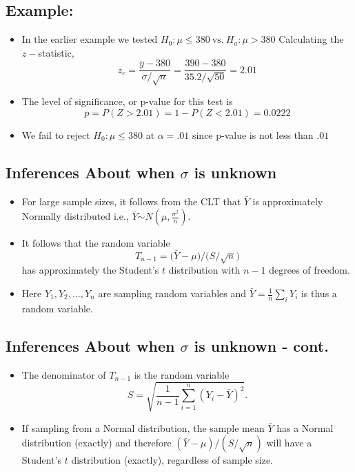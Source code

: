 \documentclass[
  letterpaper,
  DIV=11,
  numbers=noendperiod]{scrartcl}
\begin{document}
\subsection{Example:}\label{example-3}

\begin{itemize}
\item
  In the earlier example we tested
  \(H_0: \mu \leq 380\ \mbox{vs.}\ H_a: \mu > 380\) Calculating the
  \(z-\)statistic,
  \[z_c = \frac{\bar{y}-380}{\sigma/\sqrt{n}}= \frac{390-380}{35.2/\sqrt{50}} = 2.01\]
\item
  The {level of significance}, or {p-value} for this test is
  \[p= P(Z > 2.01)= 1- P(Z < 2.01)= 0.0222\]
\item
  We {fail to reject} \(H_0: \mu \leq 380\) at \(\alpha=.01\) since
  p-value is not less than \(.01\)
\end{itemize}

\subsection{\texorpdfstring{Inferences About when \(\sigma\) is
unknown}{Inferences About when \textbackslash sigma is unknown}}\label{inferences-about-when-sigma-is-unknown}

\begin{itemize}
\item
  For large sample sizes, it follows from the CLT that \(\bar{Y}\) is
  approximately Normally distributed i.e., \(\bar{Y} \dot{\sim}
  N(\mu,\frac{\sigma^2}{n})\).
\item
  It follows that the random variable
  \[T_{n-1} =\Big( \bar{Y} - \mu \Big) / \Big( S/\sqrt{n} \Big)\] has
  approximately the {Student's \(t\)} {distribution} with \(n-1\)
  {degrees of freedom}.
\item
  Here \(Y_1, Y_2, \ldots,Y_n\) are sampling random variables and
  \(\bar{Y} =
  \frac{1}{n} \displaystyle\sum_i Y_i\) is thus a random variable.
\end{itemize}

\subsection{\texorpdfstring{Inferences About when \(\sigma\) is unknown
-
cont.}{Inferences About when \textbackslash sigma is unknown - cont.}}\label{inferences-about-when-sigma-is-unknown---cont.}

\begin{itemize}
\item
  The denominator of \(T_{n-1}\) is the random variable
  \[S = \sqrt{\frac{1}{n-1} \sum_{i=1}^n (Y_i - \bar{Y})^2}.\]
\item
  If sampling from a Normal distribution, the sample mean \(\bar{Y}\)
  has a Normal distribution (exactly) and therefore
  \((\bar{Y}-\mu)/(S/\sqrt{n})\) will have a Student's \(t\)
  distribution (exactly), regardless of sample size.
\end{itemize}
\end{document}

